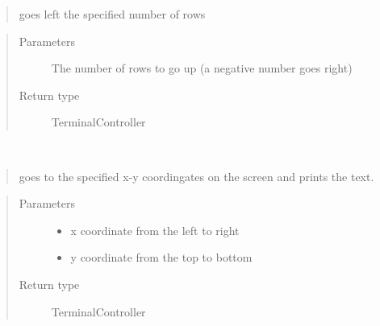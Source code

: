 \documentclass[a4paper,10pt,english]{sphinxmanual}
\begin{document}
\begin{fulllineitems}
\begin{fulllineitems}
\begin{quote}
goes left the specified number of rows
\end{quote}
\begin{quote}\begin{description}
\item[{Parameters}] \leavevmode
{} \textendash{} The number of rows to go up (a negative number goes right)

\item[{Return type}] \leavevmode
TerminalController

\end{description}\end{quote}

\end{fulllineitems}


\begin{fulllineitems}
\label{\detokenize{api/termtools.terminal.TerminalController:termtools.terminal.TerminalController.print}}
\end{fulllineitems}


\begin{fulllineitems}
\label{\detokenize{api/termtools.terminal.TerminalController:termtools.terminal.TerminalController.printat}}~\begin{quote}

goes to the specified x-y coordingates on the screen and prints the text.
\end{quote}
\begin{quote}\begin{description}
\item[{Parameters}] \leavevmode\begin{itemize}
\item {} 
 \textendash{} x coordinate from the left to right

\item {} 
 \textendash{} y coordinate from the top to bottom

\end{itemize}

\item[{Return type}] \leavevmode
TerminalController


\end{description}
\end{quote}
\end{fulllineitems}
\end{fulllineitems}
\end{document}
